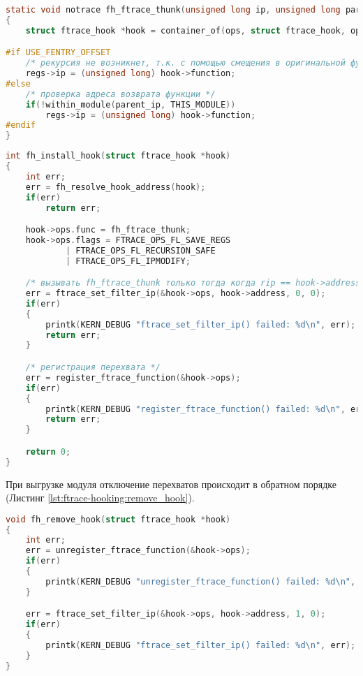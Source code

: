     \begin{lstlisting}[language=C, label=lst:ftrace-hooking:fh_ftrace_thunk, caption=Защита от рекурсии.]
static void notrace fh_ftrace_thunk(unsigned long ip, unsigned long parent_ip, struct ftrace_ops *ops, struct pt_regs *regs)
{
    struct ftrace_hook *hook = container_of(ops, struct ftrace_hook, ops);

#if USE_FENTRY_OFFSET
    /* рекурсия не возникнет, т.к. с помощью смещения в оригинальной функции был пропущен вызов ftrace  */
    regs->ip = (unsigned long) hook->function;
#else
    /* проверка адреса возврата функции */
    if(!within_module(parent_ip, THIS_MODULE))
        regs->ip = (unsigned long) hook->function;
#endif
}
    \end{lstlisting}

    \begin{lstlisting}[language=C, label=lst:ftrace-hooking:install_hook, caption=Установка перехвата функции]
int fh_install_hook(struct ftrace_hook *hook)
{
    int err;
    err = fh_resolve_hook_address(hook);
    if(err)
        return err;

    hook->ops.func = fh_ftrace_thunk;
    hook->ops.flags = FTRACE_OPS_FL_SAVE_REGS
            | FTRACE_OPS_FL_RECURSION_SAFE
            | FTRACE_OPS_FL_IPMODIFY;

    /* вызывать fh_ftrace_thunk только тогда когда rip == hook->address */
    err = ftrace_set_filter_ip(&hook->ops, hook->address, 0, 0);
    if(err)
    {
        printk(KERN_DEBUG "ftrace_set_filter_ip() failed: %d\n", err);
        return err;
    }

    /* регистрация перехвата */
    err = register_ftrace_function(&hook->ops);
    if(err)
    {
        printk(KERN_DEBUG "register_ftrace_function() failed: %d\n", err);
        return err;
    }

    return 0;
}
    \end{lstlisting}

    При выгрузке модуля отключение перехватов происходит в обратном порядке (Листинг \ref{lst:ftrace-hooking:remove_hook}).

    \begin{lstlisting}[language=C, label=lst:ftrace-hooking:remove_hook, caption=Отключение перехвата функции]
void fh_remove_hook(struct ftrace_hook *hook)
{
    int err;
    err = unregister_ftrace_function(&hook->ops);
    if(err)
    {
        printk(KERN_DEBUG "unregister_ftrace_function() failed: %d\n", err);
    }

    err = ftrace_set_filter_ip(&hook->ops, hook->address, 1, 0);
    if(err)
    {
        printk(KERN_DEBUG "ftrace_set_filter_ip() failed: %d\n", err);
    }
}
    \end{lstlisting}

